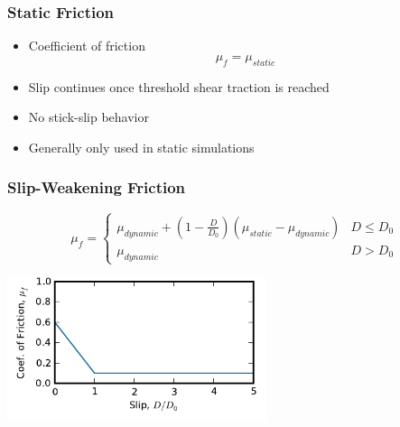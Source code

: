 \documentclass{beamer}
\begin{document}
\begin{frame}
  \frametitle{Static Friction}

  \begin{itemize}
  \item Coefficient of friction
    \begin{equation}
      \mu_f = \mu_\mathit{static}
    \end{equation}
  \item Slip continues once threshold shear traction is reached
  \item No stick-slip behavior
  \item Generally only used in static simulations
  \end{itemize}
  
\end{frame}


\begin{frame}
  \frametitle{Slip-Weakening Friction}

  \begin{equation}
    \mu_f = \left\{ \begin{array}{ll}
        \mu_\mathit{dynamic} + (1 - \frac{D}{D_0})
        (\mu_\mathit{static} -\mu_\mathit{dynamic}) & D \leq D_0 \\
        \mu_\mathit{dynamic} & D > D_0
      \end{array} \right.
  \end{equation}
  \begin{center}
    \includegraphics[height=1.65in]{figs/friction_slipweak}
  \end{center}
  
\end{frame}
\end{document}
